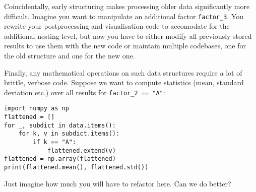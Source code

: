 \vspace{3 pt}

Coincidentally, early structuring makes processing older data significantly more difficult.
Imagine you want to manipulate an additional factor \lstinline{factor_3}.
You rewrite your postprocessing and visualisation code to accomodate for the additional nesting level,
but now you have to either modify all previously stored results to use them with the new code
or maintain multiple codebases, one for the old structure and one for the new one.

\vspace{3 pt}

Finally, any mathematical operations on such data structures require
a lot of brittle, verbose code.
Suppose we want to compute statistics (mean, standard deviation etc.)
over all results for \lstinline{factor_2 == "A"}:

\begin{lstlisting}
import numpy as np
flattened = []
for _, subdict in data.items():
    for k, v in subdict.items():
        if k == "A":
            flattened.extend(v)
flattened = np.array(flattened)
print(flattened.mean(), flattened.std())
\end{lstlisting}

\vspace{-22 pt}

Just imagine how much you will have to refactor here.
Can we do better?
